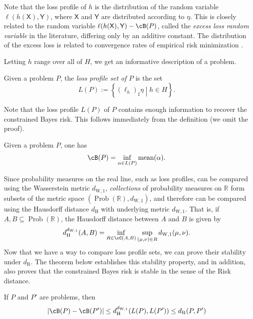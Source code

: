 \documentclass[twoside,11pt]{article}
\DeclareMathOperator{\prob}{Prob}
\newcommand{\dexp}[1][]{d_{\mathrm{R}#1}}
\newcommand{\set}[2]{\left\{ #1\middle| #2\right\}}
\newcommand{\dWp}[1]{d_{\mathrm{W},#1}}
\newcommand{\dW}{\dWp 1}
\newcommand{\dH}{d_\mathrm{H}}
\begin{document}
Note that the loss profile of $h$ is the distribution of the random variable $\ell(h(\mathsf X),\mathsf Y)$, where $\mathsf X$ and $\mathsf Y$ are distributed according to $\eta$. This is closely related to the random variable $\ell(h(\mathsf X),\mathsf Y) - \cB(P)$, called the \emph{excess loss random variable} in the literature, differing only by an additive constant. The distribution of the excess loss is related to convergence rates of empirical risk minimization \citep{van_erven_fast_2015,grunwald_fast_2020}.

Letting $h$ range over all of $H$, we get an informative description of a problem.
\begin{definition}
    Given a problem $P$, the \emph{loss profile set of $P$} is the set
    \[L(P) := \set{(\ell_{h})_\sharp\eta}{h\in H}.\]
\end{definition}

Note that the loss profile $L(P)$ of $P$ contains enough information to recover the constrained Bayes risk. This follows immediately from the definition (we omit the proof).
\begin{proposition}\label{prop:bayes-from-profile}
Given a problem $P$, one has
$$\cB(P) = \inf_{\alpha \in L(P)}\mathrm{mean}(\alpha).$$
\end{proposition}




Since probability measures on the real line, such as loss profiles, can be compared using the Wasserstein metric $\dW$, \emph{collections} of probability measures on $\mathbb R$ form subsets of the metric space $(\prob(\mathbb R), \dW)$, and therefore can be compared using the Hausdorff distance $\dH$ with underlying metric $\dW$. That is, if $A,B \subseteq \prob(\mathbb R)$, the Hausdorff distance between $A$ and $B$ is given by
\begin{align*}
    \dH^{\dW}(A,B) = \inf_{R\in \cC(A,B)} \sup_{(\mu,\nu)\in R} \dW(\mu,\nu).
\end{align*}
Now that we have a way to compare loss profile sets, we can prove their stability under $\dexp$. The theorem below establishes this stability property, and in addition, also proves that the constrained Bayes risk is  stable in the sense of the Risk distance.


\begin{theorem}\label{thm:loss-control}
    If $P$ and $P'$ are problems, then
    \[|\cB(P)-\cB(P')|\leq \dH^{\dW}(L(P),L(P')) \leq \dexp(P,P')\]
\end{theorem}
\end{document}
